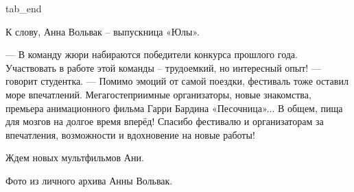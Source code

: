   tab_end
\fi

К слову, Анна Вольвак – выпускница «Юлы».

— В команду жюри набираются победители конкурса прошлого года. Участвовать в
работе этой команды – трудоемкий, но интересный опыт! — говорит студентка. —
Помимо эмоций от самой поездки, фестиваль тоже оставил море впечатлений.
Мегагостеприимные организаторы, новые знакомства, премьера анимационного фильма
Гарри Бардина «Песочница»... В общем, пища для мозгов на долгое время вперёд!
Спасибо фестивалю и организаторам за впечатления, возможности и вдохновение на
новые работы!

Ждем новых мультфильмов Ани.

Фото из личного архива Анны Вольвак.
